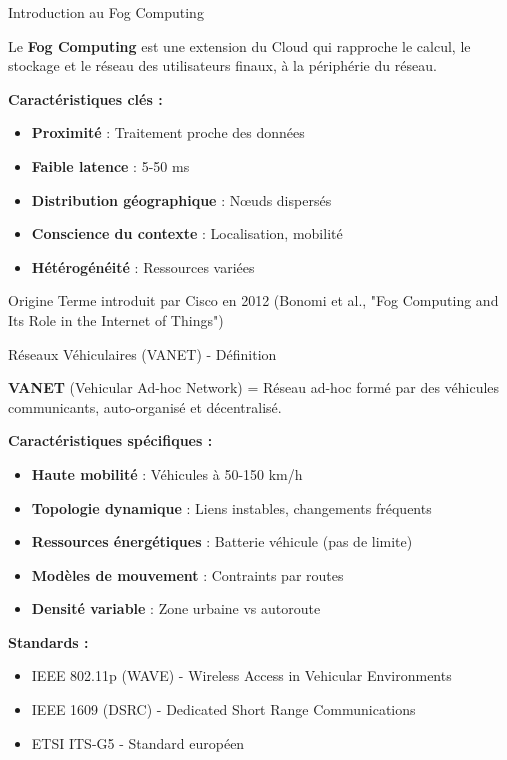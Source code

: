 ﻿\documentclass[aspectratio=169,11pt]{beamer}
\begin{document}
\begin{frame}{Introduction au Fog Computing}
\begin{definition}
Le \textbf{Fog Computing} est une extension du Cloud qui rapproche le calcul, le stockage et le r\'eseau des utilisateurs finaux, \`a la p\'eriph\'erie du r\'eseau.
\end{definition}

\vspace{0.3cm}
\textbf{Caract\'eristiques cl\'es :}
\begin{itemize}
    \item \textbf{Proximit\'e} : Traitement proche des donn\'ees
    \item \textbf{Faible latence} : 5-50 ms
    \item \textbf{Distribution g\'eographique} : N\oe uds dispers\'es
    \item \textbf{Conscience du contexte} : Localisation, mobilit\'e
    \item \textbf{H\'et\'erog\'en\'eit\'e} : Ressources vari\'ees
\end{itemize}

\vspace{0.3cm}
\begin{block}{Origine}
Terme introduit par Cisco en 2012 (Bonomi et al., "Fog Computing and Its Role in the Internet of Things")
\end{block}
\end{frame}

\begin{frame}{R\'eseaux V\'ehiculaires (VANET) - D\'efinition}
\begin{definition}
\textbf{VANET} (Vehicular Ad-hoc Network) = R\'eseau ad-hoc form\'e par des v\'ehicules communicants, auto-organis\'e et d\'ecentralis\'e.
\end{definition}

\textbf{Caract\'eristiques sp\'ecifiques :}
\begin{itemize}
    \item \textbf{Haute mobilit\'e} : V\'ehicules \`a 50-150 km/h
    \item \textbf{Topologie dynamique} : Liens instables, changements fr\'equents
    \item \textbf{Ressources \'energ\'etiques} : Batterie v\'ehicule (pas de limite)
    \item \textbf{Mod\`eles de mouvement} : Contraints par routes
    \item \textbf{Densit\'e variable} : Zone urbaine vs autoroute
\end{itemize}

\vspace{0.3cm}
\textbf{Standards :}
\begin{itemize}
    \item IEEE 802.11p (WAVE) - Wireless Access in Vehicular Environments
    \item IEEE 1609 (DSRC) - Dedicated Short Range Communications
    \item ETSI ITS-G5 - Standard europ\'een
\end{itemize}
\end{frame}
\end{document}
